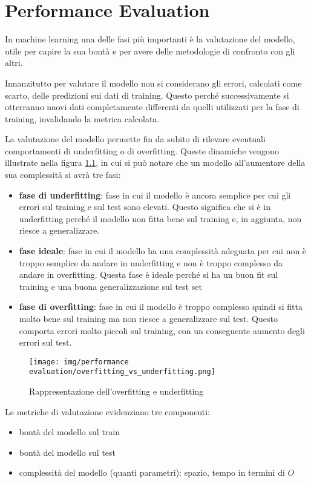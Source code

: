 \chapter{Performance Evaluation}
In machine learning una delle fasi più importanti è la valutazione del modello,
utile per capire la sua bontà e per avere delle metodologie di confronto con gli
altri.

Innanzitutto per valutare il modello non si considerano gli errori, calcolati come
scarto, delle predizioni sui dati di training. Questo perché successivamente si 
otterranno nuovi dati completamente differenti da quelli utilizzati per la fase
di training, invalidando la metrica calcolata.

La valutazione del modello permette fin da subito di rilevare eventuali comportamenti
di underfitting o di overfitting. Queste dinamiche vengono illustrate nella figura 
\ref{fig:overfitting-vs-underfitting}, in cui si può notare che un modello all'aumentare
della sua complessità si avrà tre fasi:
\begin{itemize}
    \item \textbf{fase di underfitting}: fase in cui il modello è ancora semplice
    per cui gli errori sul training e sul test sono elevati. Questo significa che
    si è in underfitting perché il modello non fitta bene sul training e, in aggiunta,
    non riesce a generalizzare.
    \item \textbf{fase ideale}: fase in cui il modello ha una complessità adeguata
    per cui non è troppo semplice da andare in underfitting e non è troppo complesso
    da andare in overfitting. Questa fase è ideale perché si ha un buon fit sul training
    e una buona generalizzazione sul test set
    \item \textbf{fase di overfitting}: fase in cui il modello è troppo complesso
    quindi si fitta molto bene sul training ma non riesce a generalizzare sul test.
    Questo comporta errori molto piccoli sul training, con un conseguente aumento
    degli errori sul test.
\end{itemize}

\begin{figure}[!ht]
    \centering
    \texttt{[image: img/performance evaluation/overfitting\_vs\_underfitting.png]}
    \caption{Rappresentazione dell'overfitting e underfitting}
    \label{fig:overfitting-vs-underfitting}
\end{figure}

Le metriche di valutazione evidenziano tre componenti:
\begin{itemize}
    \item bontà del modello sul train
    \item bontà del modello sul test
    \item complessità del modello (quanti parametri): spazio, tempo in termini di $O$
\end{itemize}

